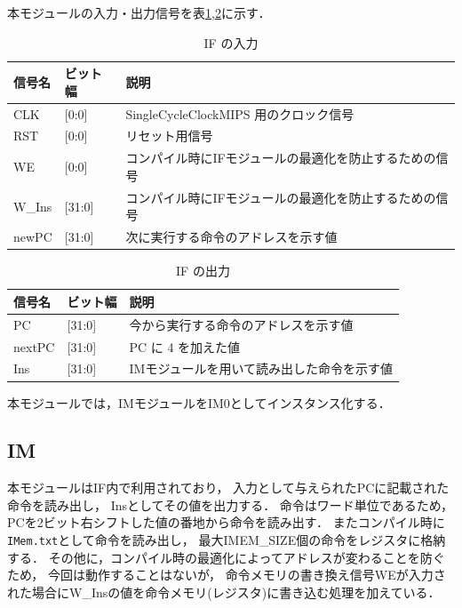 本モジュールの入力・出力信号を表\ref{tab:if_input},\ref{tab:if_output}に示す．
\begin{table}[h]
  \caption{IF の入力}
  \centering
  \begin{tabular}{l|l|l}
    信号名 & ビット幅 & 説明 \\
    \hline
    CLK & [0:0] & SingleCycleClockMIPS 用のクロック信号 \\
    RST & [0:0] & リセット用信号 \\
    WE & [0:0] & コンパイル時にIFモジュールの最適化を防止するための信号 \\
    W\_Ins & [31:0] & コンパイル時にIFモジュールの最適化を防止するための信号 \\
    newPC & [31:0] & 次に実行する命令のアドレスを示す値 \\
  \end{tabular}
  \label{tab:if_input}
\end{table}
\begin{table}[h]
  \caption{IF の出力}
  \centering
  \begin{tabular}{l|l|l}
    信号名 & ビット幅 & 説明 \\
    \hline
    PC & [31:0] & 今から実行する命令のアドレスを示す値 \\
    nextPC & [31:0] & PC に 4 を加えた値 \\
    Ins & [31:0] & IMモジュールを用いて読み出した命令を示す値 \\
  \end{tabular}
  \label{tab:if_output}
\end{table}

本モジュールでは，IMモジュールをIM0としてインスタンス化する．

\subsection{IM}
本モジュールはIF内で利用されており，
入力として与えられたPCに記載された命令を読み出し，
Insとしてその値を出力する．
命令はワード単位であるため，PCを2ビット右シフトした値の番地から命令を読み出す．
またコンパイル時に\texttt{IMem.txt}として命令を読み出し，
最大IMEM\_SIZE個の命令をレジスタに格納する．
その他に，コンパイル時の最適化によってアドレスが変わることを防ぐため，
今回は動作することはないが，
命令メモリの書き換え信号WEが入力された場合にW\_Insの値を命令メモリ(レジスタ)に書き込む処理を加えている．

